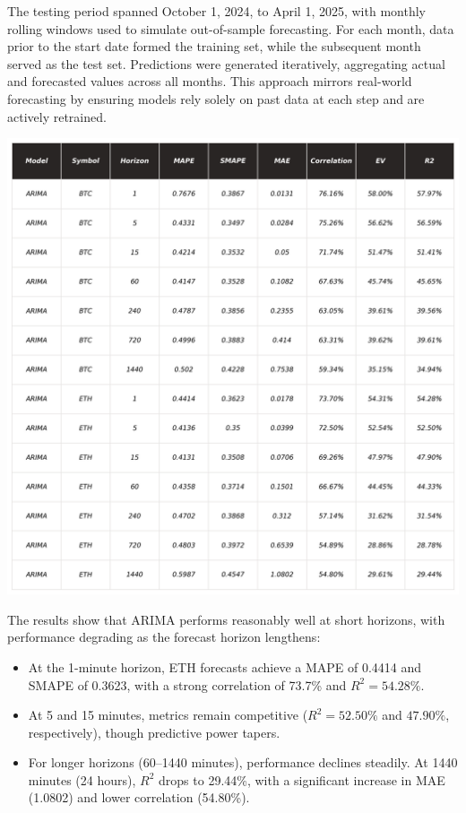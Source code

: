 \documentclass[9pt]{article}
\begin{document}
\begin{multicols}{2}
		The testing period spanned October 1, 2024, to April 1, 2025, with monthly rolling windows used to simulate out-of-sample forecasting. For each month, data prior to the start date formed the training set, while the subsequent month served as the test set. Predictions were generated iteratively, aggregating actual and forecasted values across all months. This approach mirrors real-world forecasting by ensuring models rely solely on past data at each step and are actively retrained.
		
		\centering
		\includegraphics[width=.99\columnwidth]{img/_KPI_ARIMA.png}
		\label{fig:_KPI_ARIMA}
		\justifying
		\medskip
		
		The results show that ARIMA performs reasonably well at short horizons, with performance degrading as the forecast horizon lengthens:
		\begin{itemize}
			\item At the 1-minute horizon, ETH forecasts achieve a MAPE of 0.4414 and SMAPE of 0.3623, with a strong correlation of 73.7\% and \( R^2 = 54.28\% \).
			\item At 5 and 15 minutes, metrics remain competitive (\( R^2 = 52.50\% \) and \( 47.90\% \), respectively), though predictive power tapers.
			\item For longer horizons (60–1440 minutes), performance declines steadily. At 1440 minutes (24 hours), \( R^2 \) drops to 29.44\%, with a significant increase in MAE (1.0802) and lower correlation (54.80\%).
		\end{itemize}
		

\end{multicols}
\end{document}
